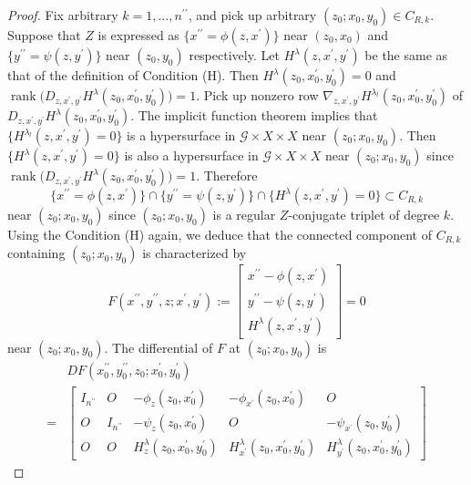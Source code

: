 \documentclass[a4paper,11pt,reqno]{amsart}
\theoremstyle{definition}
\theoremstyle{remark}
\begin{document}
\begin{proof}
Fix arbitrary $k=1,\dotsc,n^{\prime\prime}$, 
and pick up arbitrary $(z_0;x_0,y_0) \in C_{R,k}$. 
Suppose that $Z$ is expressed as 
$\{x^{\prime\prime}=\phi(z,x^\prime)\}$ near $(z_0,x_0)$ 
and 
$\{y^{\prime\prime}=\psi(z,y^\prime)\}$ near $(z_0,y_0)$ 
respectively. 
Let $H^\lambda(z,x^\prime,y^\prime)$ be the same as 
that of the definition of Condition (H). 
Then $H^\lambda(z_0,x_0^\prime,y_0^\prime)=0$ and 
$\operatorname{rank}\bigl(D_{z,x^\prime,y^\prime}H^{\lambda}(z_0,x_0^\prime,y_0^\prime)\bigr)=1$. 
Pick up nonzero row 
$\nabla_{z,x^\prime,y^\prime}H^{\lambda_l}(z_0,x_0^\prime,y_0^\prime)$ of 
$D_{z,x^\prime,y^\prime}H^{\lambda}(z_0,x_0^\prime,y_0^\prime)$. 
The implicit function theorem implies that 
$\{H^{\lambda_l}(z,x^\prime,y^\prime)=0\}$ is a hypersurface in 
$\mathcal{G} \times X \times X$ near $(z_0;x_0,y_0)$. 
Then $\{H^{\lambda}(z,x^\prime,y^\prime)=0\}$ is also a hypersurface in 
$\mathcal{G} \times X \times X$ near $(z_0;x_0,y_0)$ 
since $\operatorname{rank}\bigl(D_{z,x^\prime,y^\prime}H^{\lambda}(z_0,x_0^\prime,y_0^\prime)\bigr)=1$. Therefore 
%
%
$$
\{x^{\prime\prime}=\phi(z,x^\prime)\}
\cap
\{y^{\prime\prime}=\psi(z,y^\prime)\}
\cap
\{H^{\lambda}(z,x^\prime,y^\prime)=0\}
\subset 
C_{R,k}
$$
%
% 
near $(z_0;x_0,y_0)$ since 
$(z_0;x_0,y_0)$ is a regular $Z$-conjugate triplet of degree $k$. 
Using the Condition (H) again, we deduce that 
the connected component of $C_{R,k}$ containing $(z_0;x_0,y_0)$ is characterized by 
%
%
$$
F(x^{\prime\prime},y^{\prime\prime},z;x^\prime,y^\prime)
:=
\begin{bmatrix}
x^{\prime\prime}-\phi(z,x^\prime)
\\
y^{\prime\prime}-\psi(z,y^\prime) 
\\
H^\lambda(z,x^\prime,y^\prime)
\end{bmatrix}
=0
$$
%
%
near $(z_0;x_0,y_0)$. 
The differential of $F$ at $(z_0;x_0,y_0)$ is 
%
%
\begin{align*}
& DF(x_0^{\prime\prime},y_0^{\prime\prime},z_0;x_0^\prime,y_0^\prime)
\\
  =
& \begin{bmatrix}
  I_{n^{\prime\prime}} & O & -\phi_z(z_0,x_0^\prime) & -\phi_{x^\prime}(z_0,x_0^\prime) & O
  \\
  O & I_{n^{\prime\prime}} &  -\psi_z(z_0,x_0^\prime) & O & -\psi_{x^\prime}(z_0,y_0^\prime)
  \\
  O & O & H_z^\lambda(z_0,x_0^\prime,y_0^\prime) & H_{x^\prime}^\lambda(z_0,x_0^\prime,y_0^\prime) & H_{y^\prime}^\lambda(z_0,x_0^\prime,y_0^\prime)

\end{bmatrix}
\end{align*}
\end{proof}
\end{document}
